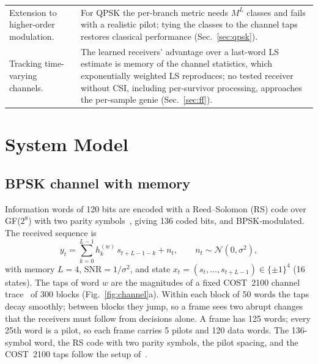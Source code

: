 \documentclass[journal]{IEEEtran}
\begin{document}
\begin{table}[t]
\begin{tabular}{@{}>{\raggedright\arraybackslash}p{}>{\raggedright\arraybackslash}p{}@{}}
Extension to higher-order modulation. & For QPSK the per-branch metric needs $M^L$ classes and fails with a realistic pilot; tying the classes to the channel taps restores classical performance (Sec.~\ref{sec:qpsk}). \\
Tracking time-varying channels. & The learned receivers' advantage over a last-word LS estimate is memory of the channel statistics, which exponentially weighted LS reproduces; no tested receiver without CSI, including per-survivor processing, approaches the per-sample genie (Sec.~\ref{sec:ff}). \\
\bottomrule
\end{tabular}
\end{table}

\section{System Model}\label{sec:model}
\subsection{BPSK channel with memory}
Information words of 120 bits are encoded with a Reed--Solomon (RS) code over GF($2^8$) with two parity symbols~\cite{reed1960polynomial}, giving 136 coded bits, and BPSK-modulated. The received sequence is
\begin{equation}\label{eq:channel}
y_t=\sum_{k=0}^{L-1} h_k^{(w)}\, s_{t+L-1-k}+n_t,\qquad n_t\sim\mathcal{N}(0,\sigma^2),
\end{equation}
with memory $L=4$, $\mathrm{SNR}=1/\sigma^2$, and state $x_t=(s_t,\dots,s_{t+L-1})\in\{\pm1\}^4$ (16 states). The taps of word $w$ are the magnitudes of a fixed COST~2100 channel trace~\cite{liu2012cost2100} of 300 blocks (Fig.~\ref{fig:channel}a). Within each block of 50 words the taps decay smoothly; between blocks they jump, so a frame sees two abrupt changes that the receivers must follow from decisions alone. A frame has 125 words; every 25th word is a pilot, so each frame carries 5 pilots and 120 data words. The 136-symbol word, the RS code with two parity symbols, the pilot spacing, and the COST~2100 taps follow the setup of~\cite{raviv2021metaviterbinet,raviv2023online}.
\end{document}
